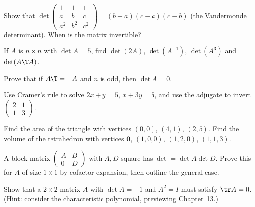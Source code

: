 \begin{exercise}
Show that $\det\begin{pmatrix}1&1&1\\a&b&c\\a^2&b^2&c^2\end{pmatrix}=(b-a)(c-a)(c-b)$ (the Vandermonde determinant). When is the matrix invertible?
\end{exercise}

\begin{exercise}
If $A$ is $n\times n$ with $\det A=5$, find $\det(2A)$, $\det(A^{-1})$, $\det(A^3)$ and $\det(A\T A)$.
\end{exercise}

\begin{exercise}
Prove that if $A\T=-A$ and $n$ is odd, then $\det A=0$.
\end{exercise}

\begin{exercise}
Use Cramer's rule to solve $2x+y=5$, $x+3y=5$, and use the adjugate to invert $\begin{pmatrix}2&1\\1&3\end{pmatrix}$.
\end{exercise}

\begin{exercise}
Find the area of the triangle with vertices $(0,0)$, $(4,1)$, $(2,5)$. Find the volume of the tetrahedron with vertices $\mathbf{0}$, $(1,0,0)$, $(1,2,0)$, $(1,1,3)$.
\end{exercise}

\begin{exercise}
A block matrix $\begin{pmatrix}A&B\\0&D\end{pmatrix}$ with $A,D$ square has $\det=\det A\det D$. Prove this for $A$ of size $1\times1$ by cofactor expansion, then outline the general case.
\end{exercise}

\begin{exercise}
Show that a $2\times2$ matrix $A$ with $\det A=-1$ and $A^2=I$ must satisfy $\tr A=0$. (Hint: consider the characteristic polynomial, previewing Chapter~13.)
\end{exercise}
